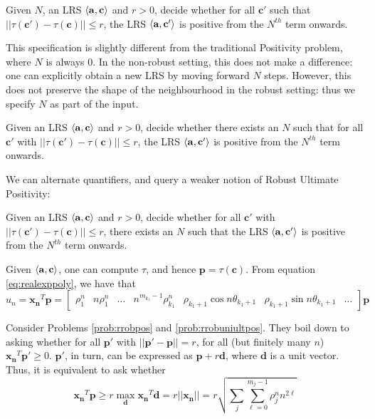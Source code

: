 \begin{problem}
\label{prob:rrobpos}
Given $N$, an LRS $\langle\mathbf{a}, \mathbf{c}\rangle$ and $r > 0$, decide whether for all $\mathbf{c'}$ such that $||\tau(\mathbf{c'}) - \tau(\mathbf{c})|| \le r$, the LRS $\langle\mathbf{a}, \mathbf{c'}\rangle$ is positive from the $N^{th}$ term onwards.
\end{problem}

This specification is slightly different from the traditional Positivity problem, where $N$ is always $0$. In the non-robust setting, this does not make a difference: one can explicitly obtain a new LRS by moving forward $N$ steps. However, this does not preserve the shape of the neighbourhood in the robust setting: thus we specify $N$ as part of the input.

\begin{problem}
\label{prob:rrobuniultpos}
Given an LRS $\langle\mathbf{a}, \mathbf{c}\rangle$ and $r > 0$, decide whether there exists an $N$ such that for all $\mathbf{c'}$ with $||\tau(\mathbf{c'}) - \tau(\mathbf{c})|| \le r$, the LRS $\langle\mathbf{a}, \mathbf{c'}\rangle$ is positive from the $N^{th}$ term onwards.
\end{problem}

We can alternate quantifiers, and query a weaker notion of Robust Ultimate Positivity:
\begin{problem}
\label{prob:rrobnonuniultpos}
Given an LRS $\langle\mathbf{a}, \mathbf{c}\rangle$ and $r > 0$, decide whether for all $\mathbf{c'}$ with $||\tau(\mathbf{c'}) - \tau(\mathbf{c})|| \le r$, there exists an $N$ such that the LRS $\langle\mathbf{a}, \mathbf{c'}\rangle$ is positive from the $N^{th}$ term onwards.
\end{problem}

Given $\langle\mathbf{a}, \mathbf{c}\rangle$, one can compute $\tau$, and hence $\mathbf{p} = \tau(\mathbf{c})$. From equation \ref{eq:realexppoly}, we have that 
\begin{equation}
\label{eq:innerprod}
u_n = \mathbf{x_n}^T\mathbf{p} = 
\begin{bmatrix}
\rho_1^n & n \rho_1^n & \dots & n^{m_{k_1}-1}\rho_{k_1}^n & \rho_{k_1+1}\cos n\theta_{k_1+1} & \rho_{k_1+1}\sin n\theta_{k_1+1} & \dots
\end{bmatrix}\mathbf{p}
\end{equation}

Consider Problems \ref{prob:rrobpos} and \ref{prob:rrobuniultpos}. They boil down to asking whether for all $\mathbf{p'}$ with $||\mathbf{p'} - \mathbf{p}|| = r$, for all (but finitely many $n$) $\mathbf{x_n}^T\mathbf{p'} \ge 0$. $\mathbf{p'}$, in turn, can be expressed as $\mathbf{p} + r\mathbf{d}$, where $\mathbf{d}$ is a unit vector. Thus, it is equivalent to ask whether
\begin{equation}
\label{eq:crux}
\mathbf{x_n}^T\mathbf{p} \ge r\max_{\mathbf{d}}\mathbf{x_n}^T\mathbf{d} = r ||\mathbf{x_n}|| = r \sqrt{\sum_{j} \sum_{\ell=0}^{m_j-1} \rho_j^n n^{2\ell}}
\end{equation}

